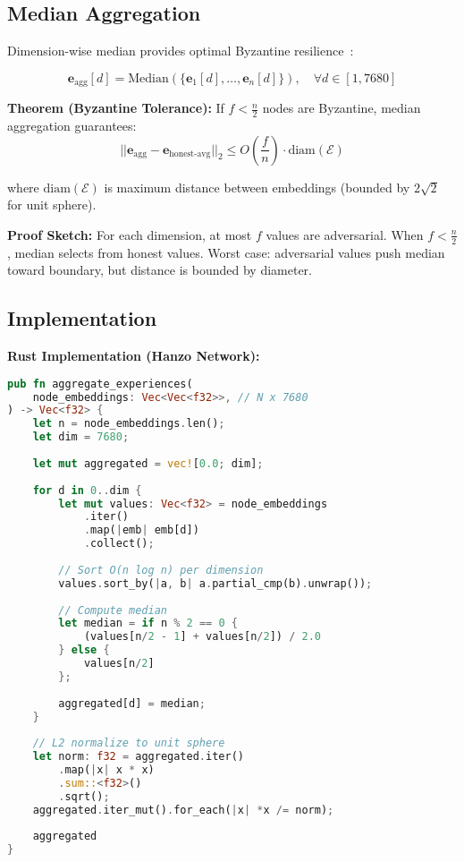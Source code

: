 \documentclass[11pt,a4paper]{article}
\begin{document}
\subsection{Median Aggregation}

Dimension-wise median provides optimal Byzantine resilience~\cite{yin2018median}:

\begin{equation}
\mathbf{e}_{\text{agg}}[d] = \text{Median}(\{\mathbf{e}_1[d], \ldots, \mathbf{e}_n[d]\}), \quad \forall d \in [1, 7680]
\end{equation}

\textbf{Theorem (Byzantine Tolerance):} If $f < \frac{n}{2}$ nodes are Byzantine, median aggregation guarantees:
\begin{equation}
||\mathbf{e}_{\text{agg}} - \mathbf{e}_{\text{honest-avg}}||_2 \leq O\left(\frac{f}{n}\right) \cdot \text{diam}(\mathcal{E})
\end{equation}

where $\text{diam}(\mathcal{E})$ is maximum distance between embeddings (bounded by $2\sqrt{2}$ for unit sphere).

\textbf{Proof Sketch:} For each dimension, at most $f$ values are adversarial. When $f < \frac{n}{2}$, median selects from honest values. Worst case: adversarial values push median toward boundary, but distance is bounded by diameter.

\subsection{Implementation}

\textbf{Rust Implementation (Hanzo Network):}

\begin{lstlisting}[language=Rust, caption=Byzantine-robust median aggregation, basicstyle=\small\ttfamily]
pub fn aggregate_experiences(
    node_embeddings: Vec<Vec<f32>>, // N x 7680
) -> Vec<f32> {
    let n = node_embeddings.len();
    let dim = 7680;
    
    let mut aggregated = vec![0.0; dim];
    
    for d in 0..dim {
        let mut values: Vec<f32> = node_embeddings
            .iter()
            .map(|emb| emb[d])
            .collect();
        
        // Sort O(n log n) per dimension
        values.sort_by(|a, b| a.partial_cmp(b).unwrap());
        
        // Compute median
        let median = if n % 2 == 0 {
            (values[n/2 - 1] + values[n/2]) / 2.0
        } else {
            values[n/2]
        };
        
        aggregated[d] = median;
    }
    
    // L2 normalize to unit sphere
    let norm: f32 = aggregated.iter()
        .map(|x| x * x)
        .sum::<f32>()
        .sqrt();
    aggregated.iter_mut().for_each(|x| *x /= norm);
    
    aggregated
}
\end{lstlisting}
\end{document}
